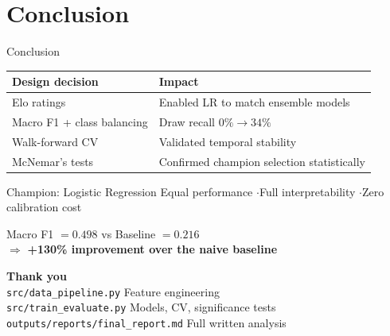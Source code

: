 \documentclass[10pt,aspectratio=169]{beamer}
\begin{document}
\section{Conclusion}

\begin{frame}{Conclusion}
  \begin{center}
    \begin{tabular}{ll}
      \toprule
      \textbf{Design decision} & \textbf{Impact} \\
      \midrule
      Elo ratings & Enabled LR to match ensemble models \\
      Macro F1 + class balancing & Draw recall $0\% \to 34\%$ \\
      Walk-forward CV & Validated temporal stability \\
      McNemar's tests & Confirmed champion selection statistically \\
      \bottomrule
    \end{tabular}
  \end{center}

  \medskip
  \begin{block}{Champion: Logistic Regression}
    \centering
    Equal performance \quad$\cdot$\quad Full interpretability \quad$\cdot$\quad Zero calibration cost
  \end{block}

  \medskip
  \begin{center}
    \large
    Macro F1 $= 0.498$ \quad vs \quad Baseline $= 0.216$ \\[4pt]
    $\Rightarrow$ \textbf{+130\% improvement over the naive baseline}
  \end{center}
\end{frame}

\begin{frame}[plain]
  \begin{center}
    \vspace{1.8cm}
    {\Huge \textbf{Thank you}}\\[1.2cm]
    \large
    \texttt{src/data\_pipeline.py} \hfill Feature engineering\\[3pt]
    \texttt{src/train\_evaluate.py} \hfill Models, CV, significance tests\\[3pt]
    \texttt{outputs/reports/final\_report.md} \hfill Full written analysis
  \end{center}
\end{frame}
\end{document}
